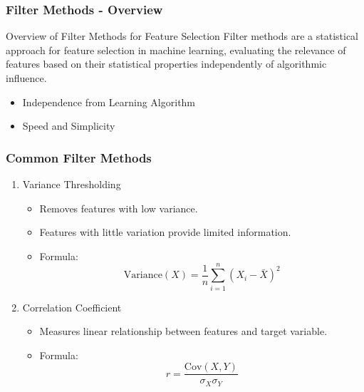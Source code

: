 \documentclass[aspectratio=169]{beamer}
\begin{document}
\begin{frame}[fragile]
    \frametitle{Filter Methods - Overview}
    \begin{block}{Overview of Filter Methods for Feature Selection}
        Filter methods are a statistical approach for feature selection in machine learning, evaluating the relevance of features based on their statistical properties independently of algorithmic influence.
    \end{block}

    \begin{itemize}
        \item Independence from Learning Algorithm
        \item Speed and Simplicity
    \end{itemize}
\end{frame}

\begin{frame}[fragile]
    \frametitle{Common Filter Methods}
    \begin{enumerate}
        \item Variance Thresholding
            \begin{itemize}
                \item Removes features with low variance.
                \item Features with little variation provide limited information.
                \item Formula: 
                \begin{equation}
                \text{Variance}(X) = \frac{1}{n} \sum_{i=1}^{n} (X_i - \bar{X})^2
                \end{equation}
            \end{itemize}

        \item Correlation Coefficient
            \begin{itemize}
                \item Measures linear relationship between features and target variable.
                \item Formula:
                \begin{equation}
                r = \frac{\text{Cov}(X, Y)}{\sigma_X \sigma_Y}
                \end{equation}
            \end{itemize}
    \end{enumerate}
\end{frame}
\end{document}
